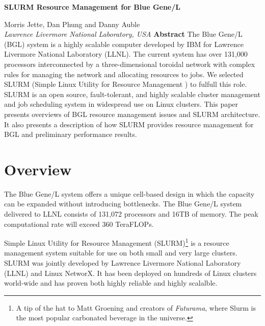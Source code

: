 \documentclass[10pt,onecolumn,times]{../common/llncs}
\def\ctit{SLURM Resource Management for Blue Gene/L}
\def\ucrl{UCRL-JC-TBD}
\def\auth{Morris Jette \\ Danny Auble \\ Dan Phung}
\def\pubdate{October 18, 2004}
\def\journal{Conference TBD}
\begin{document}

\vspace*{35mm}
\noindent\Large
\textbf{\ctit}
\baselineskip
\noindent\large
{Morris Jette, Dan Phung and Danny Auble \\
{\em Lawrence Livermore National Laboratory, USA}
\baselineskip
\noindent\large
\textbf{Abstract}
\baselineskip
\noindent\normalsize
The Blue Gene/L (BGL) system is a highly scalable computer developed 
by IBM for Lawrence Livermore National Laboratory (LLNL). 
The current system has over 131,000 processors interconnected by a 
three-dimensional toroidal network with complex rules for managing 
the network and allocating resources to jobs.
We selected SLURM (Simple Linux Utility for Resource Management ) to 
fulfull this role. 
SLURM is an open source, fault-tolerant, and highly scalable cluster 
management and job scheduling system in widespread use on Linux clusters.
This paper presents overviews of BGL resource management issues and
SLURM architecture.
It also presents a description of how SLURM provides resource 
management for BGL and preliminary performance results.

\newcommand{\munged}{{\tt munged}}
\newcommand{\srun}{{\tt srun}}
\newcommand{\scancel}{{\tt scancel}}
\newcommand{\squeue}{{\tt squeue}}
\newcommand{\scontrol}{{\tt scontrol}}
\newcommand{\sinfo}{{\tt sinfo}}
\newcommand{\slurmctld}{{\tt slurmctld}}
\newcommand{\slurmd}{{\tt slurmd}}
\newcommand{\smap}{{\tt smap}}

\section{Overview}

The Blue Gene/L system offers a unique cell-based design in which 
the capacity can be expanded without introducing bottlenecks.
The Blue Gene/L system delivered to LLNL consists of 
131,072 processors and 16TB of memory.  
The peak computational rate will exceed 360 TeraFLOPs.

Simple Linux Utility for Resource Management (SLURM)\footnote{A tip of 
the hat to Matt Groening and creators of {\em Futurama},
where Slurm is the most popular carbonated beverage in the universe.} 
is a resource management system suitable for use on both small and 
very large clusters. 
SLURM was jointly developed by Lawrence Livermore National Laboratory
(LLNL) and Linux NetworX. 
It has been deployed on hundreds of Linux clusters world-wide and has 
proven both highly reliable and highly scalalble.

}
\end{document}

